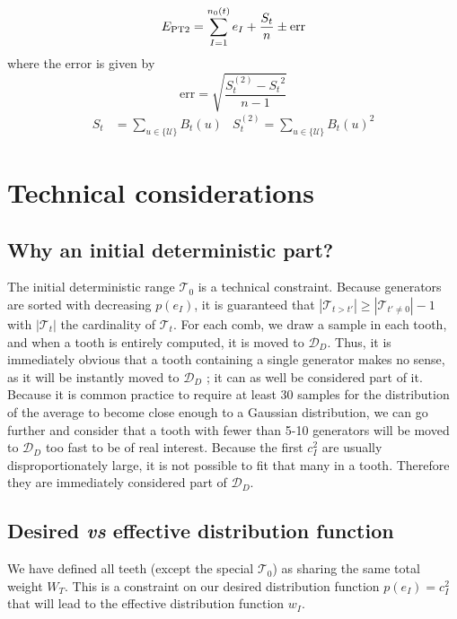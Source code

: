 \documentclass[./thesis.tex]{subfiles}
\begin{document}
\begin{equation}
E_\text{PT2} = \sum_{I=1}^{n_0(t)} e_I + \frac{S_{t}}{n}  \pm \text{err}
\end{equation}
where the error is given by
\begin{equation}
\text{err}  = \sqrt{\frac{S_{t}^{(2)} - {S_{t}}^2}{n-1} } 
\end{equation}
\begin{align}
S_{t} & = \sum_{u \in \{\mathcal{U}\}} B_{t}(u) & 
S^{(2)}_{t} = \sum_{u \in \{\mathcal{U}\}} B_{t}(u)^2
\end{align}


\section{Technical considerations}


\subsection{Why an initial deterministic part?}

The initial deterministic range $\mathcal{T}_0$ is a technical constraint.
Because generators are sorted with decreasing $p(e_I)$, it is guaranteed that $|\mathcal{T}_{t>t'}| \geq |\mathcal{T}_{t' \neq 0}|-1$ with $|\mathcal{T}_t|$ the cardinality of $\mathcal{T}_t$.
For each comb, we draw a sample in each tooth, and when a tooth is entirely computed, it is moved to $\mathcal{D}_D$. Thus, it is immediately obvious that a tooth containing a single generator makes no sense, as it will be instantly moved to $\mathcal{D}_D$ ; it can as well be considered part of it. Because it is common practice to require at least 30 samples for the distribution of the average to become close enough to a Gaussian distribution,\cite{Hogg2014Jan} we can go further and consider that a tooth with fewer than 5-10 generators will be moved to $\mathcal{D}_D$ too fast to be of real interest. Because the first $c_I^2$ are usually disproportionately large, it is not possible to fit that many in a tooth. Therefore they are immediately considered part of $\mathcal{D}_D$.

\subsection{Desired \textit{vs} effective distribution function}
\label{sec:pt2_distribution}

We have defined all teeth (except the special $\mathcal{T}_0$) as sharing the same total weight $W_T$. This is a constraint on our desired distribution function $p(e_I) = c_I^2$ that will lead to the effective distribution function $w_I$.
\end{document}
